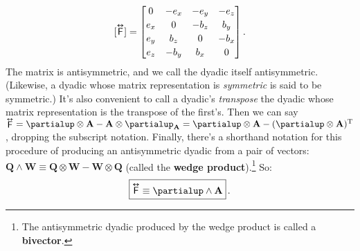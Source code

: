 \documentclass[12pt]{article}
\renewcommand{\vv}[1]{\mathbf{#1}}
\newcommand{\tightoverset}[2]{%
  \mathop{#2}\limits^{\vbox to -.5ex{\kern-0.75ex\hbox{$#1$}\vss}}}
\newcommand{\inlinedy}[1]{\tightoverset{\text{\tiny$\bm\leftrightarrow$}}{#1}}
\newcommand{\capdy}[1]{ \overset{ \text{\tiny$\bm\leftrightarrow$} }{\vphantom{\text{\small{A}}}\smash{#1}} }
\begin{document}
\begin{equation}\label{eq:emt}
[\capdy{\mathsf{F}}]
=
\begin{bmatrix}
0 & -e_x & -e_y & -e_z \\[.5ex]
e_x & 0 & -b_z & b_y \\[.5ex]
e_y & b_z & 0 & -b_x \\[.5ex]
e_z & -b_y & b_x & 0
\end{bmatrix} .
\end{equation}
The matrix is antisymmetric, and we call the dyadic itself antisymmetric. (Likewise, a dyadic whose matrix representation is \emph{symmetric} is said to be symmetric.) It's also convenient to call a dyadic's \emph{transpose} the dyadic whose matrix representation is the transpose of the first's. Then we can say ${\inlinedy{\mathsf{F}} = \partialup \otimes \vv A - \vv A \otimes \partialup_{\vv A} = \partialup \otimes \vv A - (\partialup \otimes \vv A)^\mathrm{T}}$, dropping the subscript notation. Finally, there's a shorthand notation for this procedure of producing an antisymmetric dyadic from a pair of vectors: $\vv Q \wedge \vv W \equiv \vv Q \otimes \vv W - \vv W \otimes \vv Q$ (called the \textbf{wedge product}).\footnote{The antisymmetric dyadic produced by the wedge product is called a \textbf{bivector}.} So:
\begin{equation}\label{eq:emta}
\boxed{ \vphantom{A_{A_A}} \capdy{\mathsf{F}} \equiv \partialup \wedge \vv A } \, . 
\end{equation}
\end{document}
